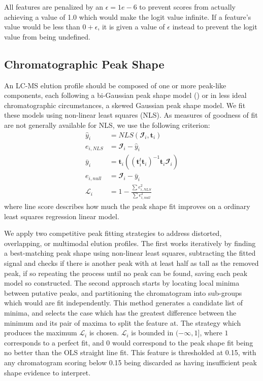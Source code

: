     All features are penalized by an $\epsilon = 1e-6$ to prevent scores from actually achieving
    a value of 1.0 which would make the logit value infinite. If a feature's value would be less
    than $0 + \epsilon$, it is given a value of $\epsilon$ instead to prevent the logit value from
    being undefined.

    \subsection{Chromatographic Peak Shape}
        An LC-MS elution profile should be composed of one or more peak-like components, each
        following a bi-Gaussian peak shape model (\cite{Yu2010}) or in less ideal chromatographic
        circumstances, a skewed Gaussian peak shape model. We fit these models using non-linear
        least squares (NLS). As measures of goodness of fit are not generally available for NLS,
        we use the following criterion:
        \begin{align}
            {\hat y_i} &= NLS(\mathbfcal{I}_i, \mathbf{t}_i) \nonumber\\
            e_{i, NLS} &= \mathbfcal{I}_i - {\hat y_i} \nonumber\\
            {\bar y_i} &= \mathbf{t}_i
                \left(
                    \left(
                        \mathbf{t}_i^t\mathbf{t}_i
                    \right)^{-1}\mathbf{t}_i\mathbfcal{I}_i
                \right)\nonumber\\
            e_{i, null} &= \mathbfcal{I}_i - {\bar y_i} \nonumber\\
            \mathscr{L}_i &= 1 - \frac{\sum{e_{i, NLS}^2}}{\sum{e_{i, null}^2}}
        \end{align}
        where line score describes how much the peak shape fit improves on a ordinary least squares
        regression linear model.

        We apply two competitive peak fitting strategies to address distorted, overlapping, or
        multimodal elution profiles. The first works iteratively by finding a best-matching peak
        shape using non-linear least squares, subtracting the fitted signal and checks if there is
        another peak with at least half as tall as the removed peak, if so repeating the process until
        no peak can be found, saving each peak model so constructed. The second approach starts
        by locating local minima between putative peaks, and partitioning the chromatogram into
        sub-groups which would are fit independently. This method generates a candidate list of
        minima, and selects the case which has the greatest difference between the minimum and its
        pair of maxima to split the feature at. The strategy which produces the maximum $\mathscr{L}_i$
        is chosen. $\mathscr{L}_i$ is bounded in $(-\infty, 1]$, where $1$ corresponds to a perfect
        fit, and 0 would correspond to the peak shape fit being no better than the OLS straight line
        fit. This feature is thresholded at 0.15, with any chromatogram scoring below 0.15 being
        discarded as having insufficient peak shape evidence to interpret.

